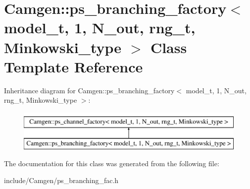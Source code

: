 \hypertarget{a00447}{}\section{Camgen\+:\+:ps\+\_\+branching\+\_\+factory$<$ model\+\_\+t, 1, N\+\_\+out, rng\+\_\+t, Minkowski\+\_\+type $>$ Class Template Reference}
\label{a00447}
Inheritance diagram for Camgen\+:\+:ps\+\_\+branching\+\_\+factory$<$ model\+\_\+t, 1, N\+\_\+out, rng\+\_\+t, Minkowski\+\_\+type $>$\+:\begin{figure}[H]
\begin{center}
\leavevmode
\includegraphics[height=2.000000cm]{a00447}
\end{center}
\end{figure}


The documentation for this class was generated from the following file\+:\begin{DoxyCompactItemize}
\item 
include/\+Camgen/ps\+\_\+branching\+\_\+fac.\+h\end{DoxyCompactItemize}
